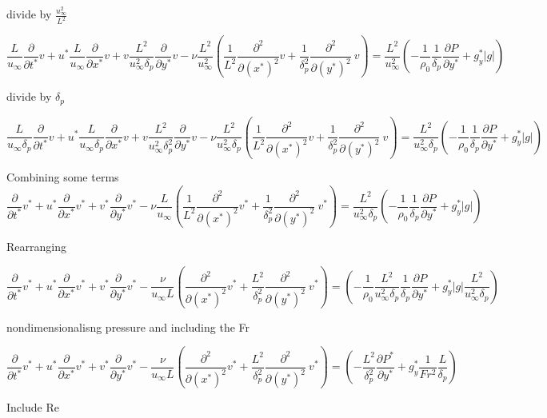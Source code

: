 \documentclass[11pt]{article}
\begin{document}
divide by $\frac{u_\infty^2}{L^2}$

$$ \frac{L}{u_\infty} \frac{\partial }{\partial t^*} v + u^* \frac{L}{u_\infty} \frac{\partial}{\partial x^*} v + v \frac{L^2}{ u_\infty^2 \delta_p} \frac{\partial}{\partial y^*} v - \nu \frac{L^2}{u_\infty^2} (\frac{1}{L^2} \frac{\partial^2}{\partial (x^*)^2} v + \frac{1}{\delta_p^2} \frac{\partial^2}{\partial (y^*)^2} \ v ) =  \frac{L^2}{u_\infty^2}(- \frac{1}{\rho_0} \frac{1}{\delta_p} \frac{\partial P}{\partial y^*} +g_y^* |g|)$$

divide by $\delta_p$

$$ \frac{L }{u_\infty \delta_p} \frac{\partial }{\partial t^*} v + u^* \frac{L }{u_\infty \delta_p} \frac{\partial}{\partial x^*} v + v \frac{L^2}{ u_\infty^2 \delta_p^2} \frac{\partial}{\partial y^*} v - \nu \frac{L^2}{u_\infty^2 \delta_p } (\frac{1}{L^2} \frac{\partial^2}{\partial (x^*)^2} v + \frac{1}{\delta_p^2} \frac{\partial^2}{\partial (y^*)^2} \ v ) =  \frac{L^2 }{u_\infty^2 \delta_p}(- \frac{1}{\rho_0} \frac{1}{\delta_p} \frac{\partial P}{\partial y^*} +g_y^* |g|)$$


Combining some terms
$$  \frac{\partial }{\partial t^*} v^* + u^*  \frac{\partial}{\partial x^*} v^* + v^* \frac{\partial}{\partial y^*} v^* - \nu \frac{L}{u_\infty  } (\frac{1}{L^2} \frac{\partial^2}{\partial (x^*)^2} v^* + \frac{1}{\delta_p^2} \frac{\partial^2}{\partial (y^*)^2} \ v^* ) =  \frac{L^2 }{u_\infty^2 \delta_p}(- \frac{1}{\rho_0} \frac{1}{\delta_p} \frac{\partial P}{\partial y^*} +g_y^* |g|)$$

Rearranging

$$  \frac{\partial }{\partial t^*} v^* + u^*  \frac{\partial}{\partial x^*} v^* + v^* \frac{\partial}{\partial y^*} v^* -  \frac{\nu}{u_\infty L } ( \frac{\partial^2}{\partial (x^*)^2} v^* + \frac{L^2}{\delta_p^2} \frac{\partial^2}{\partial (y^*)^2} \ v^* ) =  (- \frac{1}{\rho_0}\frac{L^2 }{u_\infty^2 \delta_p} \frac{1}{\delta_p} \frac{\partial P}{\partial y^*} +g_y^* |g|\frac{L^2 }{u_\infty^2 \delta_p})$$

nondimensionalisng pressure and including the Fr

$$  \frac{\partial }{\partial t^*} v^* + u^*  \frac{\partial}{\partial x^*} v^* + v^* \frac{\partial}{\partial y^*} v^* -  \frac{\nu}{u_\infty L } ( \frac{\partial^2}{\partial (x^*)^2} v^* + \frac{L^2}{\delta_p^2} \frac{\partial^2}{\partial (y^*)^2} \ v^* ) =  (- \frac{L^2 }{\delta_p^2} \frac{\partial P^*}{\partial y^*} +g_y^*\frac{1}{Fr^2}\frac{L }{ \delta_p})$$

Include Re
\end{document}
